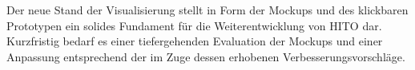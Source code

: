 Der neue Stand der Visualisierung stellt in Form der Mockups und des klickbaren Prototypen ein solides Fundament für die Weiterentwicklung von HITO dar. 
Kurzfristig bedarf es einer tiefergehenden Evaluation der Mockups und einer Anpassung entsprechend der im Zuge dessen erhobenen Verbesserungsvorschläge.

